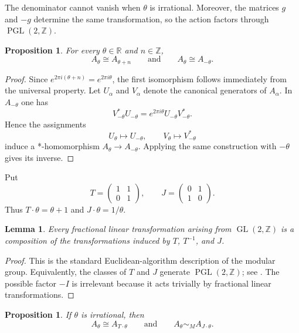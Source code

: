 \documentclass{book}
\newtheorem{lemma}[definition]{Lemma}
\newtheorem{proposition}[definition]{Proposition}
\begin{document}
The denominator cannot vanish when \(\theta\) is irrational.  Moreover,
the matrices \(g\) and \(-g\) determine the same transformation, so the
action factors through \(\operatorname{PGL}(2,\mathbb Z)\).

\begin{proposition}\label{prop:TorusElementaryIsomorphisms}
  For every \(\theta\in\mathbb R\) and \(n\in\mathbb Z\),
  \[
    A_\theta\cong A_{\theta+n}
    \qquad\text{and}\qquad
    A_\theta\cong A_{-\theta}.
  \]
\end{proposition}

\begin{proof}
  Since \(e^{2\pi i(\theta+n)}=e^{2\pi i\theta}\), the first isomorphism
  follows immediately from the universal property.  Let \(U_\alpha\) and
  \(V_\alpha\) denote the canonical generators of \(A_\alpha\).  In
  \(A_{-\theta}\) one has
  \[
    V_{-\theta}^{*}U_{-\theta}
      =e^{2\pi i\theta}U_{-\theta}V_{-\theta}^{*}.
  \]
  Hence the assignments
  \[
    U_\theta\longmapsto U_{-\theta},
    \qquad
    V_\theta\longmapsto V_{-\theta}^{*}
  \]
  induce a *-homomorphism \(A_\theta\to A_{-\theta}\).  Applying the same
  construction with \(-\theta\) gives its inverse.
\end{proof}

Put
\[
  T=\begin{pmatrix}1&1\\0&1\end{pmatrix},
  \qquad
  J=\begin{pmatrix}0&1\\1&0\end{pmatrix}.
\]
Thus \(T\cdot\theta=\theta+1\) and
\(J\cdot\theta=1/\theta\).

\begin{lemma}\label{lem:ModularGenerators}
  Every fractional linear transformation arising from
  \(\operatorname{GL}(2,\mathbb Z)\) is a composition of the
  transformations induced by \(T\), \(T^{-1}\), and \(J\).
\end{lemma}

\begin{proof}
  This is the standard Euclidean-algorithm description of the modular
  group.  Equivalently, the classes of \(T\) and \(J\) generate
  \(\operatorname{PGL}(2,\mathbb Z)\); see
  \cite[p.~421]{Rieffel1981}.  The possible factor \(-I\) is irrelevant
  because it acts trivially by fractional linear transformations.
\end{proof}

\begin{proposition}\label{prop:ModularGeneratorEquivalences}
  If \(\theta\) is irrational, then
  \[
    A_\theta\cong A_{T\cdot\theta}
    \qquad\text{and}\qquad
    A_\theta\sim_M A_{J\cdot\theta}.
  \]
\end{proposition}
\end{document}
